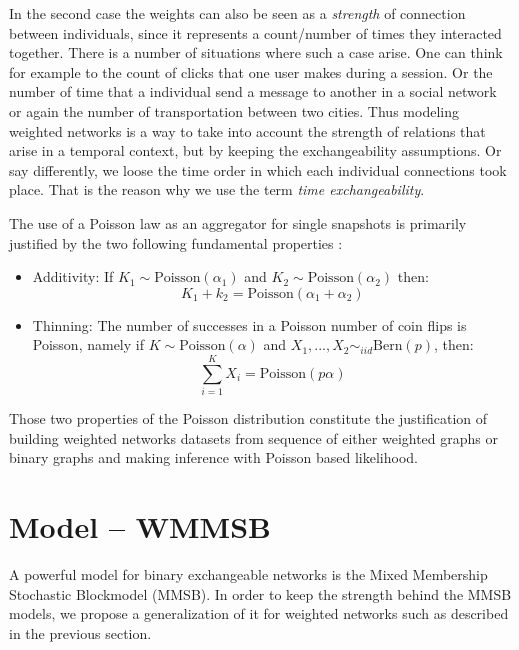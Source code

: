 In the second case the weights can also be seen as a \emph{strength} of connection between individuals, since it represents a count/number of times they interacted together. There is a number of situations where such a case arise. One can think for example to the count of clicks that one user makes during a session. Or the number of time that a individual send a message to another in a social network or again the number of transportation between two cities. Thus modeling weighted networks is a way to take into account the strength of relations that arise in a temporal context, but by keeping the exchangeability assumptions. Or say differently, we loose the time order in which each individual connections took place. That is the reason why we use the term \emph{time exchangeability}.

The use of a Poisson law as an aggregator for single snapshots is primarily justified by the two following fundamental properties \cite{orbanz2012lecture}:
\begin{itemize}
\item{Additivity}: If $K_1 \sim \mathrm{Poisson}(\alpha_1)$ and $K_2 \sim \mathrm{Poisson}(\alpha_2)$ then:
    \begin{equation}
        K_1 + k_2 = \mathrm{Poisson}(\alpha_1 + \alpha_2)
    \end{equation}
\item {Thinning}: The number of successes in a Poisson number of coin flips is Poisson, namely if $K \sim \mathrm{Poisson}(\alpha)$ and $X_1,...,X_2 \sim_{iid} \mathrm{Bern}(p)$, then:
    \begin{equation}
        \sum_{i=1}^K X_i = \mathrm{Poisson}(p\alpha)
    \end{equation}
\end{itemize}

Those two properties of the Poisson distribution constitute the justification of building weighted networks datasets from sequence of either weighted graphs or binary graphs and making inference with Poisson based likelihood.

\section{Model -- WMMSB}
A powerful model for binary exchangeable networks is the Mixed Membership Stochastic Blockmodel (MMSB). In order to keep the strength behind the MMSB models, we propose a generalization of it for weighted networks such as described in the previous section.

